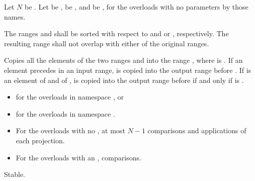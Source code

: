 \begin{itemdescr}
\pnum
Let $N$ be .
Let  be ,
 be , and
 be ,
for the overloads with no parameters by those names.

\pnum
\requires
The ranges  and 
shall be sorted with respect to  and  or ,
respectively.
The resulting range shall not overlap with either of the original ranges.

\pnum
\effects
Copies all the elements of the two ranges  and
 into the range ,
where  is .
If an element  precedes  in an input range,
 is copied into the output range before .
If  is an element of  and
 of ,
 is copied into the output range before  if and only if
is .

\pnum
\returns
\begin{itemize}
\item
  for the overloads in namespace , or
\item
  for the overloads in namespace .
\end{itemize}

\pnum
\complexity
\begin{itemize}
\item
  For the overloads with no ,
  at most $N - 1$ comparisons and applications of each projection.
\item
  For the overloads with an ,  comparisons.
\end{itemize}

\pnum
\remarks
Stable.
\end{itemdescr}

